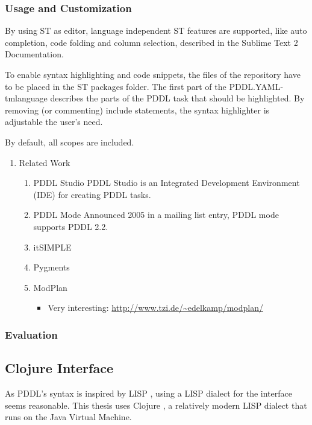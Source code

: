 \documentclass[11pt]{article}
\begin{document}
\subsubsection{Usage and Customization}
\label{sec-4-3-2}
By using ST as editor, language independent ST features are supported, like auto
completion, code folding and column selection, described in the
Sublime Text 2 Documentation.

To enable syntax highlighting and code snippets, the files of the
repository have to be placed in the ST packages folder. The first part
of the PDDL.YAML-tmlanguage describes the parts of the PDDL task that
should be highlighted. By removing (or commenting) include statements,
the syntax highlighter is adjustable the user's need.

By default, all scopes are included.

\begin{enumerate}
\item Related Work
\label{sec-4-3-2-1}
\begin{enumerate}
\item PDDL Studio
\label{sec-4-3-2-1-1}
PDDL Studio \parencite{plch2012inspect} is an Integrated Development Environment (IDE) for
creating PDDL tasks. 

\item PDDL Mode
\label{sec-4-3-2-1-2}
Announced 2005 in a mailing list entry, PDDL mode supports PDDL 2.2. 
\item itSIMPLE
\label{sec-4-3-2-1-3}

\item Pygments
\label{sec-4-3-2-1-4}
\item ModPlan
\label{sec-4-3-2-1-5}
\begin{itemize}
\item Very interesting: \url{http://www.tzi.de/~edelkamp/modplan/}
\end{itemize}
\end{enumerate}
\end{enumerate}

\subsubsection{Evaluation}
\label{sec-4-3-3}

\subsection{Clojure Interface}
\label{sec-4-4}
As PDDL's syntax is inspired by LISP \parencite[64]{fox2003pddl2},
using a LISP dialect for the interface seems reasonable. This thesis
uses Clojure \parencite{hickey2008clojure}, a relatively modern LISP
dialect that runs on the Java Virtual Machine.
\end{document}
